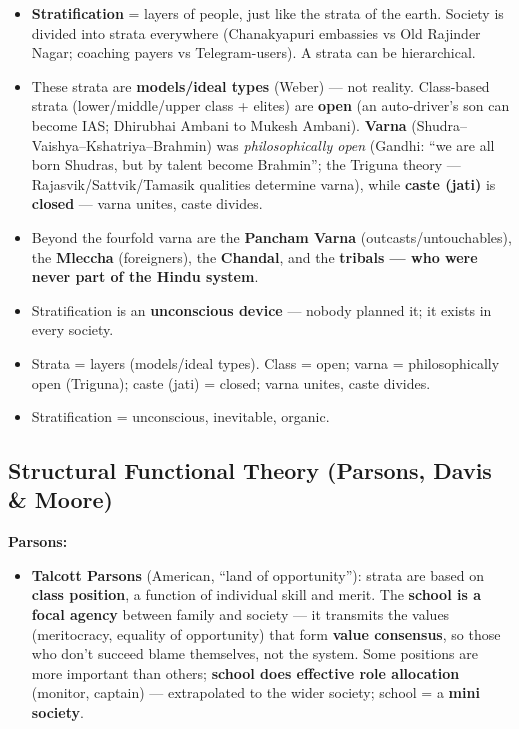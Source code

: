 \begin{KeyConcept}
\begin{itemize}
\item \textbf{Stratification} = layers of people, just like the strata of the earth. Society is divided into strata everywhere (Chanakyapuri embassies vs Old Rajinder Nagar; coaching payers vs Telegram-users). A strata can be hierarchical.
\item These strata are \textbf{models/ideal types} (Weber) --- not reality. Class-based strata (lower/middle/upper class + elites) are \textbf{open} (an auto-driver's son can become IAS; Dhirubhai Ambani to Mukesh Ambani). \textbf{Varna} (Shudra--Vaishya--Kshatriya--Brahmin) was \textit{philosophically open} (Gandhi: ``we are all born Shudras, but by talent become Brahmin''; the Triguna theory --- Rajasvik/Sattvik/Tamasik qualities determine varna), while \textbf{caste (jati)} is \textbf{closed} --- varna unites, caste divides.
\item Beyond the fourfold varna are the \textbf{Pancham Varna} (outcasts/untouchables), the \textbf{Mleccha} (foreigners), the \textbf{Chandal}, and the \textbf{tribals --- who were never part of the Hindu system}.
\item Stratification is an \textbf{unconscious device} --- nobody planned it; it exists in every society.
\end{itemize}
\end{KeyConcept}

\begin{QuickRevision}
\begin{itemize}
\item Strata = layers (models/ideal types). Class = open; varna = philosophically open (Triguna); caste (jati) = closed; varna unites, caste divides.
\item Stratification = unconscious, inevitable, organic.
\end{itemize}
\end{QuickRevision}

\sectiondivider

\subsection{Structural Functional Theory (Parsons, Davis \& Moore)}

\begin{KeyConcept}
\textbf{Parsons:}
\begin{itemize}
\item \textbf{Talcott Parsons} (American, ``land of opportunity''): strata are based on \textbf{class position}, a function of individual skill and merit. The \textbf{school is a focal agency} between family and society --- it transmits the values (meritocracy, equality of opportunity) that form \textbf{value consensus}, so those who don't succeed blame themselves, not the system. Some positions are more important than others; \textbf{school does effective role allocation} (monitor, captain) --- extrapolated to the wider society; school = a \textbf{mini society}.
\end{itemize}
\end{KeyConcept}

